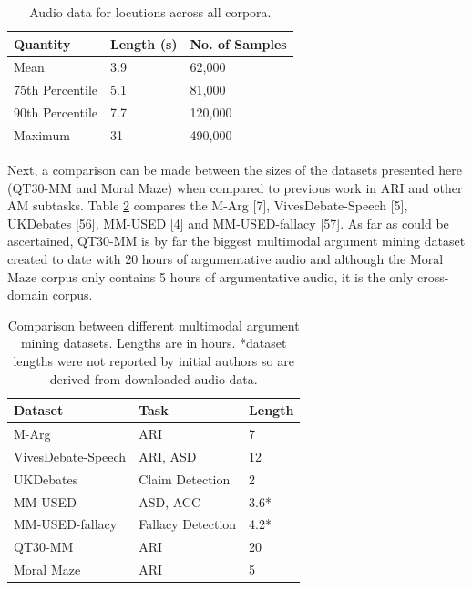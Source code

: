 \documentclass[twocolumn,twoside]{article}
\begin{document}
\begin{table}[h]
\centering
\caption{Audio data for locutions across all corpora.\label{tbl:audio-complete}}
\begin{tabular}{|l|ll|}
\hline
Quantity        & Length (s) & No. of Samples \\ \hline
Mean            & 3.9        & 62,000         \\
75th Percentile & 5.1        & 81,000         \\
90th Percentile & 7.7        & 120,000        \\
Maximum         & 31         & 490,000        \\ \hline
\end{tabular}
\end{table}

Next, a comparison can be made between the sizes of the datasets
presented here (QT30-MM and Moral Maze) when compared to previous work
in ARI and other AM subtasks. Table \ref{tbl:mm-comparison} compares the
M-Arg {[}7{]}, VivesDebate-Speech {[}5{]}, UKDebates {[}56{]}, MM-USED
{[}4{]} and MM-USED-fallacy {[}57{]}. As far as could be ascertained,
QT30-MM is by far the biggest multimodal argument mining dataset created
to date with 20 hours of argumentative audio and although the Moral Maze
corpus only contains 5 hours of argumentative audio, it is the only
cross-domain corpus.

\begin{table}[h]
\centering
\caption{Comparison between different multimodal argument mining datasets. Lengths are in hours. *dataset lengths were not reported by initial authors so are derived from downloaded audio data. \label{tbl:mm-comparison}}
\begin{tabular}{|l|l|l|}
\hline
Dataset            & Task              & Length \\ \hline
M-Arg              & ARI               & 7              \\
VivesDebate-Speech & ARI, ASD          & 12             \\
UKDebates          & Claim Detection   & 2              \\
MM-USED            & ASD, ACC          & 3.6*           \\
MM-USED-fallacy    & Fallacy Detection & 4.2*           \\ \hline
QT30-MM            & ARI               & 20             \\
Moral Maze         & ARI               & 5              \\ \hline
\end{tabular}
\end{table}
\end{document}
